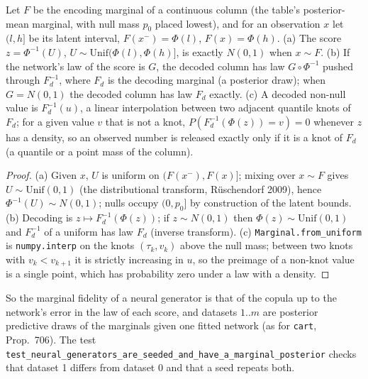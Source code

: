 \setcounter{proposition}{1799}
\begin{proposition}\label{prop:nnmarg}
Let $F$ be the encoding marginal of a continuous column (the table's posterior-mean marginal, with null mass $p_0$ placed lowest), and for an observation $x$ let $(l,h]$ be its latent interval, $F(x^-)=\Phi(l)$, $F(x)=\Phi(h)$. (a) The score $z=\Phi^{-1}(U)$, $U\sim\mathrm{Unif}(\Phi(l),\Phi(h)]$, is exactly $N(0,1)$ when $x\sim F$. (b) If the network's law of the score is $G$, the decoded column has law $G\circ\Phi^{-1}$ pushed through $F_d^{-1}$, where $F_d$ is the decoding marginal (a posterior draw); when $G=N(0,1)$ the decoded column has law $F_d$ exactly. (c) A decoded non-null value is $F_d^{-1}(u)$, a linear interpolation between two adjacent quantile knots of $F_d$; for a given value $v$ that is not a knot, $P(F_d^{-1}(\Phi(z))=v)=0$ whenever $z$ has a density, so an observed number is released exactly only if it is a knot of $F_d$ (a quantile or a point mass of the column).
\end{proposition}
\begin{proof}
(a) Given $x$, $U$ is uniform on $(F(x^-),F(x)]$; mixing over $x\sim F$ gives $U\sim\mathrm{Unif}(0,1)$ (the distributional transform, R\"uschendorf 2009), hence $\Phi^{-1}(U)\sim N(0,1)$; nulls occupy $(0,p_0]$ by construction of the latent bounds. (b) Decoding is $z\mapsto F_d^{-1}(\Phi(z))$; if $z\sim N(0,1)$ then $\Phi(z)\sim\mathrm{Unif}(0,1)$ and $F_d^{-1}$ of a uniform has law $F_d$ (inverse transform). (c) \texttt{Marginal.from\_uniform} is \texttt{numpy.interp} on the knots $(\tau_k,v_k)$ above the null mass; between two knots with $v_k<v_{k+1}$ it is strictly increasing in $u$, so the preimage of a non-knot value is a single point, which has probability zero under a law with a density.
\end{proof}
\noindent So the marginal fidelity of a neural generator is that of the copula up to the network's error in the law of each score, and datasets $1..m$ are posterior predictive draws of the marginals given one fitted network (as for \texttt{cart}, Prop.~706). The test \texttt{test\_neural\_generators\_are\_seeded\_and\_have\_a\_marginal\_posterior} checks that dataset 1 differs from dataset 0 and that a seed repeats both.

